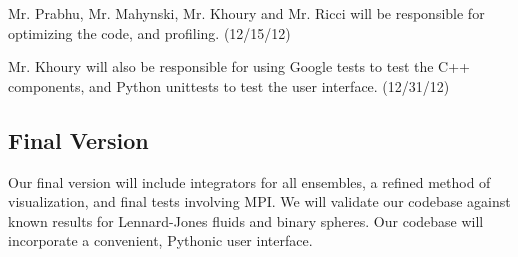 \documentclass[10pt]{article}
\begin{document}
Mr. Prabhu, Mr. Mahynski, Mr. Khoury and Mr. Ricci will  be responsible for optimizing the code, and profiling. (12/15/12)

Mr. Khoury will also be responsible for using Google tests to test the C++ components, and Python unittests to test the user interface. (12/31/12)

\subsection{Final Version}
Our final version will include integrators for all ensembles, a refined method of visualization, and final tests involving MPI.  We will validate our codebase against known results for Lennard-Jones fluids and binary spheres.  Our codebase will incorporate a convenient, Pythonic user interface.
\end{document}
